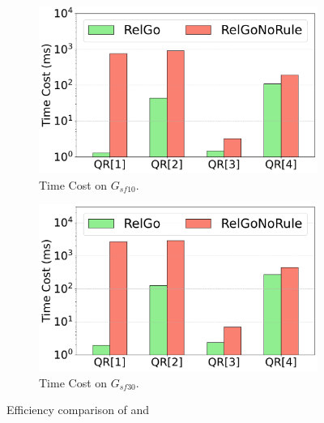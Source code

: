 \begin{figure}[ht]
    \vspace{-1em}
    \centering
    \begin{subfigure}[b]{.45\linewidth}
        \centering
        \includegraphics[width=\linewidth]{./figures/exp/filter_sf10.pdf}
        \vspace{-1.5em}
        \caption{Time Cost on $G_{sf10}$.}
        \label{fig:exp-filter-sf10}
    \end{subfigure}
    \begin{subfigure}[b]{0.45\linewidth}
        \centering
        \includegraphics[width=\linewidth]{./figures/exp/filter_sf30.pdf}
        \vspace{-1.5em}
        \caption{Time Cost on $G_{sf30}$.}
        \label{fig:exp-filter-sf30}
    \end{subfigure}
    \caption{Efficiency comparison of \name and \relgonofi}
    \label{fig:exp-filter}
\end{figure}

